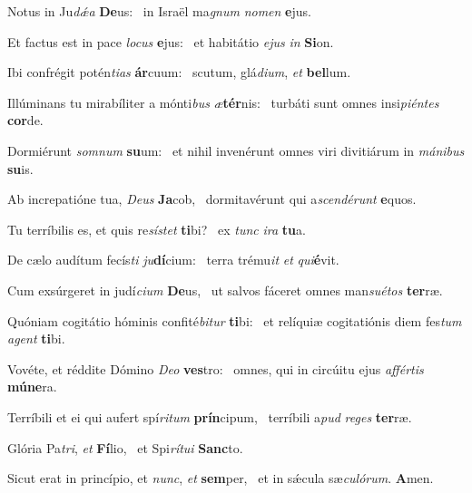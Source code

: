 \item Notus in Ju\textit{dǽa} \textbf{De}us:~\psstar{} in Israël ma\textit{gnum} \textit{nomen} \textbf{e}jus.
\item Et factus est in pace \textit{locus} \textbf{e}jus:~\psstar{} et habitátio \textit{ejus} \textit{in} \textbf{Si}on.
\item Ibi confrégit potén\textit{tias} \textbf{ár}cuum:~\psstar{} scutum, glá\textit{dium}, \textit{et} \textbf{bel}lum.
\item Illúminans tu mirabíliter a mónti\textit{bus} \textit{æ}\textbf{tér}nis:~\psstar{} turbáti sunt omnes insi\textit{piéntes} \textbf{cor}de.
\item Dormiérunt \textit{somnum} \textbf{su}um:~\psstar{} et nihil invenérunt omnes viri divitiárum in \textit{mánibus} \textbf{su}is.
\item Ab increpatióne tua, \textit{Deus} \textbf{Ja}cob,~\psstar{} dormitavérunt qui a\textit{scendérunt} \textbf{e}quos.
\item Tu terríbilis es, et quis re\textit{sístet} \textbf{ti}bi?~\psstar{} ex \textit{tunc} \textit{ira} \textbf{tu}a.
\item De cælo audítum fecís\textit{ti} \textit{ju}\textbf{dí}cium:~\psstar{} terra trému\textit{it} \textit{et} \textit{qui}\textbf{é}vit.
\item Cum exsúrgeret in judí\textit{cium} \textbf{De}us,~\psstar{} ut salvos fáceret omnes man\textit{suétos} \textbf{ter}ræ.
\item Quóniam cogitátio hóminis confité\textit{bitur} \textbf{ti}bi:~\psstar{} et relíquiæ cogitatiónis diem fes\textit{tum} \textit{agent} \textbf{ti}bi.
\item Vovéte, et réddite Dómino \textit{Deo} \textbf{ves}tro:~\psstar{} omnes, qui in circúitu ejus \textit{affértis} \textbf{mú}\textbf{ne}ra.
\item Terríbili et ei qui aufert spí\textit{ritum} \textbf{prín}cipum,~\psstar{} terríbili a\textit{pud} \textit{reges} \textbf{ter}ræ.
\item Glória Pa\textit{tri}, \textit{et} \textbf{Fí}lio,~\psstar{} et Spi\textit{rítui} \textbf{Sanc}to.
\item Sicut erat in princípio, et \textit{nunc}, \textit{et} \textbf{sem}per,~\psstar{} et in sǽcula sæ\textit{culórum}. \textbf{A}men.
